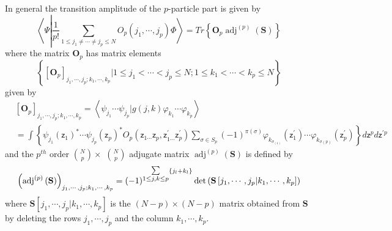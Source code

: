 \documentclass[aps,preprint]{revtex4}%
\begin{document}
In general the transition amplitude of the $p$-particle part is given by%
\begin{equation}
\left\langle \Psi\left\vert \frac{1}{p!}%
{\displaystyle\sum\limits_{1\leq j_{1}\neq\cdots\neq j_{p}\leq N}}
O_{p}\left(  j_{1},\cdots,j_{p}\right)  \right.  \Phi\right\rangle =Tr\left\{
\mathbf{O}_{p}\operatorname{adj}^{\left(  p\right)  }\left(  \mathbf{S}%
\right)  \right\}
\end{equation}
where the matrix $\mathbf{O}_{p}$ has matrix elements
\begin{equation}
\left\{  \left[  \mathbf{O}_{p}\right]  _{j_{1},\cdots,j_{p};k_{1}%
,\cdots,k_{p}}|1\leq j_{1}<\cdots<j_{p}\leq N;1\leq k_{1}<\cdots<k_{p}\leq
N\right\}
\end{equation}
given by
\begin{align}
&  \left[  \mathbf{O}_{p}\right]  _{j_{1},\cdots,j_{p};k_{1},\cdots,k_{p}%
}=\left\langle \psi_{j_{1}}\cdots\psi_{j_{p}}|g\left(  j,k\right)
\varphi_{k_{1}}\cdots\varphi_{k_{p}}\right\rangle \nonumber\\
&  =%
{\displaystyle\int}
\left\{  \psi_{j_{1}}\left(  \mathsf{z}_{1}\right)  ^{\ast}\cdots\psi_{j_{p}%
}\left(  \mathsf{z}_{p}\right)  ^{\ast}O_{p}\left(  \mathsf{z}_{1\cdots
}\mathsf{z}_{p}\mathsf{,z}_{1\cdots}^{\prime}\mathsf{z}_{p}^{\prime}\right)
{\displaystyle\sum\limits_{\sigma\in S_{p}}}
\left(  -1\right)  ^{\pi\left(  \sigma\right)  }\varphi_{k_{\sigma_{\left(
1\right)  }}}\left(  \mathsf{z}_{1}^{\prime}\right)  \cdots\varphi
_{k_{\sigma\left(  p\right)  }}\left(  \mathsf{z}_{p}^{\prime}\right)
\right\}  d\mathsf{z}^{p}d\mathsf{z}^{\prime p}%
\end{align}
and the $p^{th}$ order $\binom{N}{p}\times$ $\binom{N}{p}$ adjugate matrix
$\operatorname{adj}^{\left(  p\right)  }\left(  \mathbf{S}\right)  $ is
defined by
\begin{equation}
\left(  \operatorname{adj}^{\left(  p\right)  }\left(  \mathbf{S}\right)
\right)  _{j_{1},\cdots,j_{p};k_{1},\cdots,k_{p}}=\left(  -1\right)  ^{%
{\textstyle\sum\limits_{1\leq j,k\leq p}}
\left\{  j_{l}+k_{l}\right\}  }\det\left(  \mathbf{S}\left[  j_{1}%
,\cdots,j_{p}|k_{1},\cdots,k_{p}\right]  \right)
\end{equation}
where $\mathbf{S}\left[  j_{1},\cdots,j_{p}|k_{1},\cdots,k_{p}\right]  $ is
the $\left(  N-p\right)  \times\left(  N-p\right)  $ matrix obtained from
$\mathbf{S}$ by deleting the rows $j_{1},\cdots,j_{p}$ and the column
$k_{1},\cdots,k_{p}$.



\end{document}
